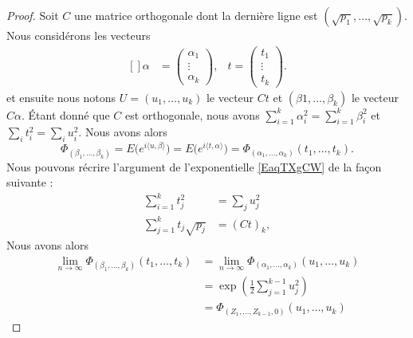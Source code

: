 \begin{proof}
	Soit \( C\) une matrice orthogonale dont la dernière ligne est \( (\sqrt{p_1},\ldots, \sqrt{p_k})\). Nous considérons les vecteurs
	\begin{equation}
		\begin{aligned}[]
			\alpha & =\begin{pmatrix}
				          \alpha_1 \\
				          \vdots   \\
				          \alpha_k
			          \end{pmatrix},
			       & t=\begin{pmatrix}
				           t_1    \\
				           \vdots \\
				           t_k
			           \end{pmatrix}.
		\end{aligned}
	\end{equation}
	et ensuite nous notons \( U=(u_1,\ldots,u_k)\) le vecteur \( Ct\) et \( (\beta1,\ldots,\beta_k)\) le vecteur \( C\alpha\). Étant donné que \( C\) est orthogonale, nous avons \( \sum_{i=1}^k\alpha_i^2=\sum_{i=1}^k\beta_i^2\) et \( \sum_i t_i^2=\sum_iu_i^2\). Nous avons alors
	\begin{equation}
		\Phi_{(\beta_1,\ldots, \beta_k)}=E\big(  e^{i\langle u, \beta\rangle } \big)=E\big(  e^{i\langle t, \alpha\rangle } \big)=\Phi_{(\alpha_1,\ldots, \alpha_k)}(t_1,\ldots, t_k).
	\end{equation}
	Nous pouvons récrire l'argument de l'exponentielle \eqref{EaqTXgCW} de la façon suivante :
	\begin{subequations}
		\begin{align}
			\sum_{i=1}^kt_j^2         & =\sum_ju_j^2 \\
			\sum_{j=1}^kt_j\sqrt{p_j} & =(Ct)_{k},
		\end{align}
	\end{subequations}
	Nous avons alors
	\begin{subequations}
		\begin{align}
			\lim_{n\to \infty} \Phi_{(\beta_1,\ldots, \beta_k)}(t_1,\ldots, t_k) & =\lim_{n\to \infty} \Phi_{(\alpha_1,\ldots, \alpha_k)}(u_1,\ldots, u_k) \\
			                                                                     & =\exp\left( \frac{ 1 }{2}\sum_{j=1}^{k-1}u_j^2 \right)                  \\
			                                                                     & =\Phi_{(Z_1,\ldots, Z_{k-1},0)}(u_1,\ldots, u_k)
		\end{align}

\end{subequations}
\end{proof}
